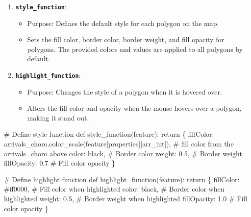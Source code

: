 \documentclass[
  letterpaper,
  DIV=11,
  numbers=noendperiod]{scrreprt}
\newenvironment{Shaded}{\begin{snugshade}}{\end{snugshade}}
\newcommand{\CommentTok}[1]{\textcolor[rgb]{0.37,0.37,0.37}{#1}}
\newcommand{\ControlFlowTok}[1]{\textcolor[rgb]{0.00,0.23,0.31}{#1}}
\newcommand{\FloatTok}[1]{\textcolor[rgb]{0.68,0.00,0.00}{#1}}
\newcommand{\KeywordTok}[1]{\textcolor[rgb]{0.00,0.23,0.31}{#1}}
\newcommand{\NormalTok}[1]{\textcolor[rgb]{0.00,0.23,0.31}{#1}}
\newcommand{\StringTok}[1]{\textcolor[rgb]{0.13,0.47,0.30}{#1}}
\providecommand{\tightlist}{%
  \setlength{\itemsep}{0pt}\setlength{\parskip}{0pt}}\usepackage{longtable,booktabs,array}
\begin{document}
\begin{enumerate}
\def\labelenumi{\arabic{enumi}.}
\tightlist
\item
  \textbf{\texttt{style\_function}}:

  \begin{itemize}
  \tightlist
  \item
    Purpose: Defines the default style for each polygon on the map.
  \item
    Sets the fill color, border color, border weight, and fill opacity
    for polygons. The provided colors and values are applied to all
    polygons by default.
  \end{itemize}
\item
  \textbf{\texttt{highlight\_function}}:

  \begin{itemize}
  \tightlist
  \item
    Purpose: Changes the style of a polygon when it is hovered over.
  \item
    Alters the fill color and opacity when the mouse hovers over a
    polygon, making it stand out.
  \end{itemize}
\end{enumerate}

\begin{Shaded}
\begin{Highlighting}[]
\CommentTok{\# Define style function}
\KeywordTok{def}\NormalTok{ style\_function(feature):}
    \ControlFlowTok{return}\NormalTok{ \{}
        \StringTok{\textquotesingle{}fillColor\textquotesingle{}}\NormalTok{: arrivals\_choro.color\_scale(feature[}\StringTok{\textquotesingle{}properties\textquotesingle{}}\NormalTok{][}\StringTok{\textquotesingle{}arr\_int\textquotesingle{}}\NormalTok{]),  }\CommentTok{\# fill color from the arrivals\_choro above}
        \StringTok{\textquotesingle{}color\textquotesingle{}}\NormalTok{: }\StringTok{\textquotesingle{}black\textquotesingle{}}\NormalTok{,  }\CommentTok{\# Border color}
        \StringTok{\textquotesingle{}weight\textquotesingle{}}\NormalTok{: }\FloatTok{0.5}\NormalTok{, }\CommentTok{\# Border weight}
        \StringTok{\textquotesingle{}fillOpacity\textquotesingle{}}\NormalTok{: }\FloatTok{0.7} \CommentTok{\# Fill color opacity }
\NormalTok{    \}}

\CommentTok{\# Define highlight function}
\KeywordTok{def}\NormalTok{ highlight\_function(feature):}
    \ControlFlowTok{return}\NormalTok{ \{}
        \StringTok{\textquotesingle{}fillColor\textquotesingle{}}\NormalTok{: }\StringTok{\textquotesingle{}\#ff0000\textquotesingle{}}\NormalTok{,  }\CommentTok{\# Fill color when highlighted}
        \StringTok{\textquotesingle{}color\textquotesingle{}}\NormalTok{: }\StringTok{\textquotesingle{}black\textquotesingle{}}\NormalTok{,  }\CommentTok{\# Border color when highlighted}
        \StringTok{\textquotesingle{}weight\textquotesingle{}}\NormalTok{: }\FloatTok{0.5}\NormalTok{, }\CommentTok{\# Border weight when highlighted}
        \StringTok{\textquotesingle{}fillOpacity\textquotesingle{}}\NormalTok{: }\FloatTok{1.0} \CommentTok{\# Fill color opacity }
\NormalTok{    \}}
\end{Highlighting}
\end{Shaded}
\end{document}
